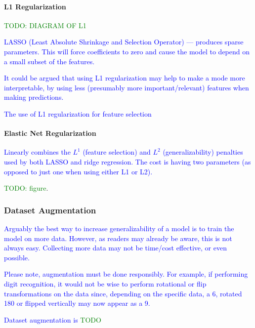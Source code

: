 
\paragraph{L1 Regularization}

\textcolor{green}{TODO: DIAGRAM OF L1}

\textcolor{blue}{LASSO (Least Absolute Shrinkage and Selection Operator) --- produces sparse parameters. This will force coefficients to zero and cause the model to depend on a small subset of the features.}

\textcolor{blue}{It could be argued that using L1 regularization may help to make a mode more interpretable, by using less (presumably more important/relevant) features when making predictions.}

\textcolor{blue}{The use of L1 regularization for feature selection}


\paragraph{Elastic Net Regularization}

\textcolor{blue}{Linearly combines the $L^1$ (feature selection) and $L^2$ (generalizability) penalties used by both LASSO and ridge regression. The cost is having two parameters (as opposed to just one when using either L1 or L2).}

\textcolor{green}{TODO: figure}.

\subsubsection{Dataset Augmentation}

\textcolor{blue}{Arguably the best way to increase generalizability of a model is to train the model on more data. However, as readers may already be aware, this is not always easy. Collecting more data may not be time/cost effective, or even possible.}

\textcolor{blue}{Please note, augmentation must be done responsibly. For example, if performing digit recognition, it would not be wise to perform rotational or flip transformations on the data since, depending on the specific data, a 6, rotated 180 or flipped vertically may now appear as a 9.}

\textcolor{blue}{Dataset augmentation is \textcolor{green}{TODO}}


